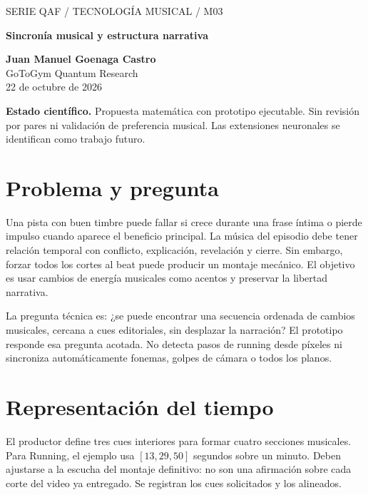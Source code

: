 \documentclass[11pt,a4paper]{article}
\begin{document}
\begin{center}{\sffamily\small\textcolor{mint}{SERIE QAF / TECNOLOGÍA MUSICAL / M03}}\par\vspace{8pt}
{\sffamily\LARGE\bfseries\textcolor{ink}{Sincronía musical y estructura narrativa}}\par\vspace{10pt}
\textbf{Juan Manuel Goenaga Castro}\\GoToGym Quantum Research\\22 de octubre de 2026
\end{center}
\colorbox{ink!6}{\parbox{.96\linewidth}{\small\textbf{Estado científico.} Propuesta matemática con prototipo ejecutable. Sin revisión por pares ni validación de preferencia musical. Las extensiones neuronales se identifican como trabajo futuro.}}
\begin{abstract}
Se estudia la colocación de cambios musicales dentro de un episodio de sesenta segundos. La propuesta conserva la voz y el montaje y desplaza únicamente fronteras del arreglo hacia una rejilla de pulsos, bajo tolerancias explícitas. Se implementa programación dinámica exacta para elegir conjuntamente las posiciones. Un caso pequeño se compara con enumeración exhaustiva. El mecanismo evita llamar sincronía cinematográfica a la simple superposición de una pista que no conoce el relato.
\end{abstract}
\section{Problema y pregunta}
Una pista con buen timbre puede fallar si crece durante una frase íntima o pierde impulso cuando aparece el beneficio principal. La música del episodio debe tener relación temporal con conflicto, explicación, revelación y cierre. Sin embargo, forzar todos los cortes al beat puede producir un montaje mecánico. El objetivo es usar cambios de energía musicales como acentos y preservar la libertad narrativa.

La pregunta técnica es: ¿se puede encontrar una secuencia ordenada de cambios musicales, cercana a cues editoriales, sin desplazar la narración? El prototipo responde esa pregunta acotada. No detecta pasos de running desde píxeles ni sincroniza automáticamente fonemas, golpes de cámara o todos los planos.
\section{Representación del tiempo}
El productor define tres cues interiores para formar cuatro secciones musicales. Para Running, el ejemplo usa $[13,29,50]$ segundos sobre un minuto. Deben ajustarse a la escucha del montaje definitivo: no son una afirmación sobre cada corte del video ya entregado. Se registran los cues solicitados y los alineados.
\end{document}
